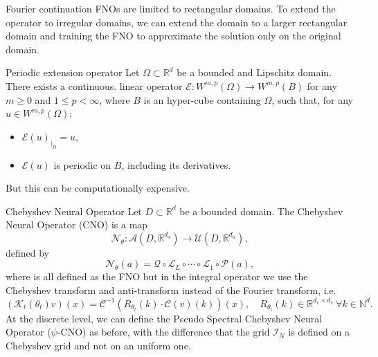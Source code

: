 \documentclass{beamer}
\newcommand{\numberset}{\mathbb}
\newcommand{\N}{\numberset{N}}
\newcommand{\R}{\numberset{R}}
\begin{document}
\begin{frame}{Fourier continuation}
	FNOs are limited to rectangular domains. To extend the operator to irregular domains, we can extend the domain to a larger rectangular domain and training the FNO to approximate the solution only on the original domain.
	\begin{themedTitleBlock}{Periodic extension operator}
		Let $\Omega \subset \R^d$ be a bounded and Lipschitz domain. There exists a continuous. linear operator $\mathcal{E}: W^{m,p}(\Omega) \to W^{m,p}(B)$ for any $m \ge 0$ and $1 \le p < \infty$, where $B$ is an hyper-cube containing $\Omega$, such that, for any $u \in W^{m,p}(\Omega)$:
		\begin{itemize}
			\item $\mathcal{E}(u)_{|_{\Omega}} = u$,
			\item $\mathcal{E}(u)$ is periodic on $B$, including its derivatives.
		\end{itemize}
	\end{themedTitleBlock}
	\pause	
	But this can be computationally expensive.
	
\end{frame}



\begin{frame}{Chebyshev Neural Operator}
	Let $ D \subset \R^d $ be a bounded domain. The Chebyshev Neural Operator (CNO) is a map
	\[ \mathcal{N}_{\theta}: \mathcal{A}(D, \R^{d_a}) \to \mathcal{U}(D, \R^{d_u}), \]
	defined by
	\[ \mathcal{N}_{\theta}(a) = \mathcal{Q} \circ \mathcal{L}_L \circ \cdots \circ \mathcal{L}_1 \circ \mathcal{P}(a), \]
	where is all defined as the FNO but in the integral operator we use the Chebyshev transform and anti-transform instead of the Fourier transform, i.e.
	\[  (\mathcal{K}_t(\theta_t)v)(x)= \mathcal{C}^{-1}\left( R_{\theta_t}(k) \cdot \mathcal{C}(v)(k) \right)(x), \quad R_{\theta_t}(k) \in \R^{d_v \times d_v} \ \forall k \in \N^d. \]
	\pause 
	At the discrete level, we can define the Pseudo Spectral Chebyshev Neural Operator ($\psi$-CNO) as before, with the difference that the grid $ \mathcal{I}_N $ is defined on a Chebyshev grid and not on an uniform one.
\end{frame}

\end{document}
